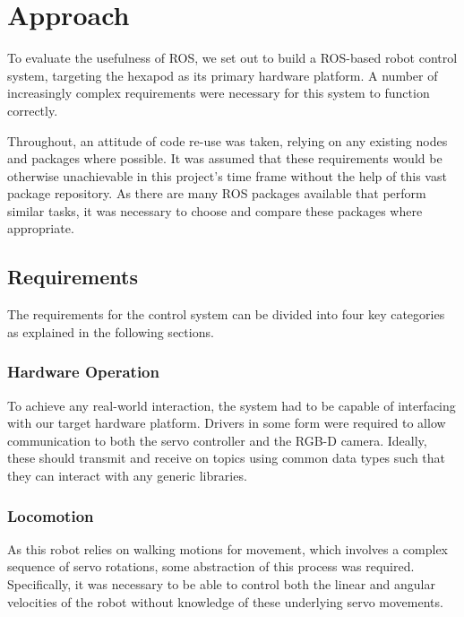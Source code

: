 \chapter{Approach}
\label{chap:approach}

To evaluate the usefulness of ROS, we set out to build a ROS-based robot control system, targeting the hexapod as its primary hardware platform. A number of increasingly complex requirements were necessary for this system to function correctly.

Throughout, an attitude of code re-use was taken, relying on any existing nodes and packages where possible. It was assumed that these requirements would be otherwise unachievable in this project's time frame without the help of this vast package repository. As there are many ROS packages available that perform similar tasks, it was necessary to choose and compare these packages where appropriate. 


\section{Requirements}

The requirements for the control system can be divided into four key categories as explained in the following sections.

\subsection{Hardware Operation}

To achieve any real-world interaction, the system had to be capable of interfacing with our target hardware platform. Drivers in some form were required to allow communication to both the servo controller and the RGB-D camera. Ideally, these should transmit and receive on topics using common data types such that they can interact with any generic libraries.

\subsection{Locomotion}

As this robot relies on walking motions for movement, which involves a complex sequence of servo rotations, some abstraction of this process was required. Specifically, it was necessary to be able to control both the linear and angular velocities of the robot without knowledge of these underlying servo movements.

